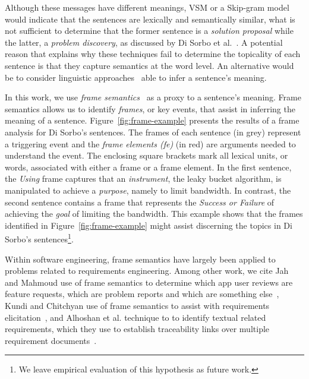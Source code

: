 Although these messages have different meanings, \acs{VSM} or a Skip-gram model would indicate that the sentences are lexically and semantically similar, what is not sufficient to determine that the former sentence
 is a \textit{solution proposal} while the latter, a \textit{problem discovery}, as discussed by Di Sorbo et al.~\cite{Sorbo2015}. 
A potential reason that explains why these techniques fail to determine the topicality of each sentence is that they capture semantics at the word level. 
An alternative would be to consider linguistic approaches~\cite{ariel2008pragmatics, austin1975pragmatics} able to infer a sentence's meaning.



In this work, we use \textit{frame semantics}~\cite{fillmore1976frame, Baker1998} as a proxy to a sentence's meaning.
Frame semantics allows us to identify \textit{frames},
or key events, that assist in inferring the meaning of a sentence.
Figure~\ref{fig:frame-example} presents the results of a frame
analysis for Di Sorbo's sentences.
The frames of each sentence (in grey) represent a
triggering event and the \textit{frame elements (fe)} (in red) are arguments needed
to understand the event. The enclosing square brackets
mark all lexical units, or words,
associated with either a frame or a frame element.
In the first sentence, the \textit{Using} frame
captures that an \textit{instrument}, the leaky bucket algorithm, is
manipulated to achieve a \textit{purpose}, namely to limit bandwidth.
In contrast, the second sentence contains a frame that represents the \textit{Success or Failure}
of achieving the \textit{goal} of limiting the bandwidth. 
This example shows that the frames identified in Figure~\ref{fig:frame-example} might assist discerning the topics in Di Sorbo's sentences\footnote{We leave empirical evaluation of this hypothesis as future work.}.





Within software engineering, frame semantics have largely been applied to problems related
to requirements engineering.
Among other work, we cite 
Jah and Mahmoud use of frame semantics
to determine which app user reviews are feature requests, which are problem reports and which
are something else~\cite{jha2017},
Kundi and Chitchyan use of frame semantics to assist with requirements
elicitation~\cite{kundi2017}, and Alhoshan et al. technique to 
to identify textual related requirements, which they use to establish traceability links 
over multiple requirement documents~\cite{alhoshan2019using}.



